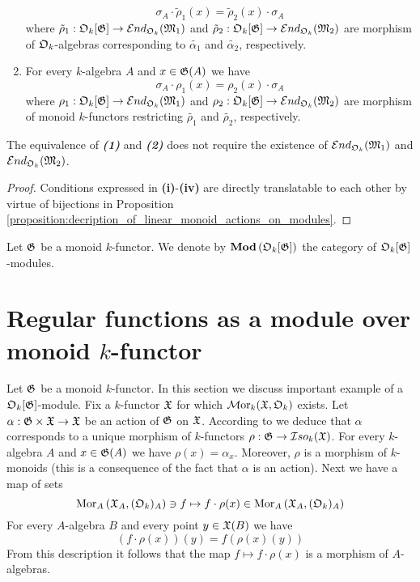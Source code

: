 \begin{proposition}
\begin{enumerate}[label=\emph{\textbf{(\roman*)}}, leftmargin=3.0em]
$$\sigma_A \cdot \tilde{\rho}_1(x) = \tilde{\rho}_2(x) \cdot \sigma_A$$
where $\tilde{\rho}_1:{\mathfrak O}_k[{\mathfrak G}] \rightarrow {\mathcal E} nd_{{\mathfrak O}_k}({\mathfrak M}_1)$ and $\tilde{\rho}_2:{\mathfrak O}_k[{\mathfrak G}] \rightarrow {\mathcal E} nd_{{\mathfrak O}_k}({\mathfrak M}_2)$ are morphism of ${\mathfrak O}_k$-algebras corresponding to $\tilde{\alpha_1}$ and $\tilde{\alpha_2}$, respectively.
\item For every $k$-algebra $A$ and $x\in {\mathfrak G}(A)$ we have
$$\sigma_A \cdot \rho_1(x) = \rho_2(x) \cdot \sigma_A$$
where $\rho_1:{\mathfrak O}_k[{\mathfrak G}] \rightarrow {\mathcal E} nd_{{\mathfrak O}_k}({\mathfrak M}_1)$ and $\rho_2:{\mathfrak O}_k[{\mathfrak G}] \rightarrow {\mathcal E} nd_{{\mathfrak O}_k}({\mathfrak M}_2)$ are morphism of monoid $k$-functors restricting $\tilde{\rho_1}$ and $\tilde{\rho_2}$, respectively.
\end{enumerate}
The equivalence of \emph{\textbf{(1)}} and \emph{\textbf{(2)}} does not require the existence of ${\mathcal E} nd_{{\mathfrak O}_k}({\mathfrak M}_1)$ and ${\mathcal E} nd_{{\mathfrak O}_k}({\mathfrak M}_2)$.
\end{proposition}
\begin{proof}
Conditions expressed in \textbf{(i)}-\textbf{(iv)} are directly translatable to each other by virtue of bijections in Proposition \ref{proposition:decription_of_linear_monoid_actions_on_modules}. 
\end{proof}
\noindent
Let ${\mathfrak G}$ be a monoid $k$-functor. We denote by $\mathbf{Mod}\left({\mathfrak O}_k[{\mathfrak G}]\right)$ the category of ${\mathfrak O}_k[{\mathfrak G}]$-modules.

\section{Regular functions as a module over monoid $k$-functor}
\noindent
Let ${\mathfrak G}$ be a monoid $k$-functor. In this section we discuss important example of a ${\mathfrak O}_k[{\mathfrak G}]$-module. Fix a $k$-functor ${\mathfrak X}$ for which $\mathcal{M}\mathrm{or}_k({\mathfrak X},{\mathfrak O}_k)$ exists. Let $\alpha:{\mathfrak G}\times {\mathfrak X}\rightarrow {\mathfrak X}$ be an action of ${\mathfrak G}$ on ${\mathfrak X}$. According to {\cite[Corollary 2.12]{kfunctors}} we deduce that $\alpha$ corresponds to a unique morphism of $k$-functors $\rho:{\mathfrak G}\rightarrow {\mathcal I} so_k({\mathfrak X})$. For every $k$-algebra $A$ and $x\in {\mathfrak G}(A)$ we have $\rho(x) = \alpha_x$. Moreover, $\rho$ is a morphism of $k$-monoids (this is a consequence of the fact that $\alpha$ is an action). Next we have a map of sets
$$\mathrm{Mor}_A\left({\mathfrak X}_A,({\mathfrak O}_k)_A\right) \ni f\mapsto f\cdot \rho(x)\in \mathrm{Mor}_A\left({\mathfrak X}_A,({\mathfrak O}_k)_A\right)$$
For every $A$-algebra $B$ and every point $y\in {\mathfrak X}(B)$ we have
$$(f\cdot \rho(x))(y) = f\left(\rho(x)(y)\right)$$
From this description it follows that the map $f\mapsto f\cdot \rho(x)$ is a morphism of $A$-algebras.









\small






